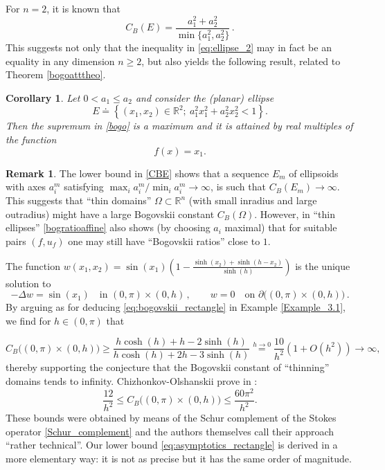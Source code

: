 \documentclass[11pt]{article}
\theoremstyle{plain}
\newtheorem{corollary}[theorem]{Corollary}
\theoremstyle{definition}
\newtheorem{remark}[theorem]{Remark}
\numberwithin{equation}{section}
\newcommand{\R}{\mathbb{R}}
\begin{document}
For $n=2$, it is known \cite[Section 5.1.1]{costabel} that
$$
C_B(E)=\frac{a_1^2+a_2^2}{\min\{a_1^2,a_2^2\}}\, .
$$
This suggests not only that the inequality in \eqref{eq:ellipse_2} may in fact be  an equality in any dimension $n\ge2$, but also yields the following result,
related to Theorem \ref{bogoatttheo}.

\begin{corollary}
	Let $0<a_1\le a_2$ and consider the (planar) ellipse
	$$
	E\doteq\left\{(x_1,x_2)\in\R^2;\ a_1^2x_1^2+a_2^2x_2^2<1\right\}.
	$$
	Then the supremum in \eqref{bogo} is a maximum and it is attained by real multiples of the function
	$$f(x)= x_1.$$
\end{corollary}

\begin{remark}\label{rem:thin_rectangles}
The lower bound in \eqref{CBE} shows that a sequence $E_m$ of ellipsoids with axes $a_i^m$ satisfying $\max_ia_i^m/\min_ia_i^m\to\infty$,
is such that $C_B(E_m)\to\infty$. This suggests that ``thin domains'' $\Omega\subset\R^n$ (with small inradius and large outradius) might have
a large Bogovskii constant $C_B(\Omega)$.
However, in ``thin ellipses''  \eqref{bogratioaffine} also shows (by choosing $a_i$ maximal) that for suitable pairs $(f,u_f)$ one may still have ``Bogovskii ratios'' close to $1$.\par
The function $w(x_1,x_2)=\sin(x_1)\left(1-\frac{\sinh(x_2)+\sinh(h-x_2)}{\sinh(h)}\right)$
is the unique solution to
$$
-\Delta w=\sin(x_1)\quad\mbox{in }(0,\pi)\times(0,h)\, ,\qquad w=0\quad\mbox{on }\partial\Big((0,\pi)\times(0,h)\Big)\, .
$$
By arguing as for deducing \eqref{eq:bogovskii_rectangle} in Example \ref{Example_3.1}, we find for $h\in (0,\pi)$ that

\begin{equation}\label{eq:asymptotics_rectangle}
C_B\big((0,\pi)\times (0,h)\big)\ge
\frac{ h\cosh(h)+h -2\sinh(h)}{ h\cosh(h)+2h -3\sinh(h)}
\stackrel{h\to0}{=}\frac{10}{h^2}(1+O(h^2))\to\infty,
\end{equation}
thereby supporting the conjecture that the Bogovskii constant of ``thinning'' domains tends to infinity.
Chizhonkov-Olshanskii  prove in \cite[Section 2, Equation
(30)]{Chizhonkov_Olshanskii_2000}:
\begin{equation*}
\frac{12}{h^2}\le C_B\big((0,\pi)\times (0,h)\big)\le \frac{60\pi^2}{h^2}.
\end{equation*}
These bounds were obtained by means of the Schur complement of the Stokes operator \eqref{Schur_complement} and the authors themselves call their approach ``rather technical''.
Our lower bound \eqref{eq:asymptotics_rectangle} is derived in a more elementary way: it is not as precise but it has the same order of magnitude.
\end{remark}
\end{document}
